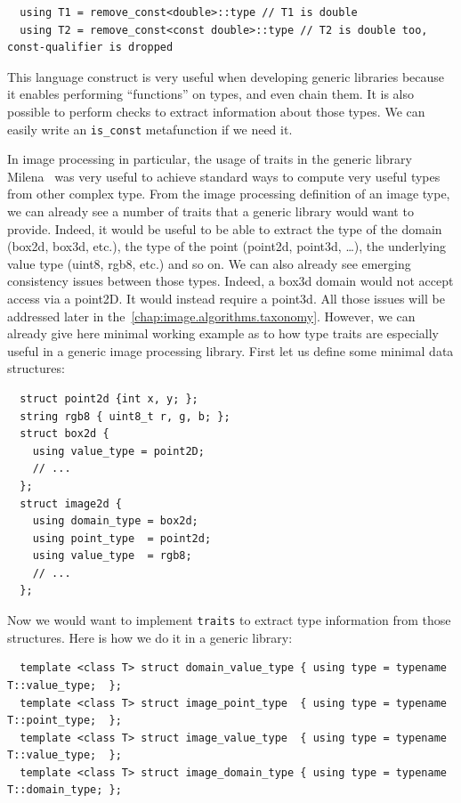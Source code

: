 \begin{verbatim}
  using T1 = remove_const<double>::type // T1 is double
  using T2 = remove_const<const double>::type // T2 is double too, const-qualifier is dropped
\end{verbatim}

This language construct is very useful when developing generic libraries because it enables performing ``functions'' on
types, and even chain them. It is also possible to perform checks to extract information about those types. We can
easily write an \texttt{is\_const} metafunction if we need it.

In image processing in particular, the usage of traits in the generic library
Milena~\parencite{levillain.2009.ismm,levillain.2010.icip} was very useful to achieve standard ways to compute very
useful types from other complex type. From the image processing definition of an image type, we can already see a number
of traits that a generic library would want to provide. Indeed, it would be useful to be able to extract the type of the
domain (box2d, box3d, etc.), the type of the point (point2d, point3d, \ldots), the underlying value type (uint8, rgb8,
etc.) and so on. We can also already see emerging consistency issues between those types. Indeed, a box3d domain would
not accept access via a point2D. It would instead require a point3d. All those issues will be addressed later in
the~\cref{chap:image.algorithms.taxonomy}. However, we can already give here minimal working example as to how type
traits are especially useful in a generic image processing library. First let us define some minimal data structures:

\begin{verbatim}
  struct point2d {int x, y; };
  string rgb8 { uint8_t r, g, b; };
  struct box2d {
    using value_type = point2D;
    // ...
  };
  struct image2d {
    using domain_type = box2d;
    using point_type  = point2d;
    using value_type  = rgb8;
    // ...
  };
\end{verbatim}

Now we would want to implement \texttt{traits} to extract type information from those structures. Here is how we do it
in a generic library:

\begin{verbatim}
  template <class T> struct domain_value_type { using type = typename T::value_type;  };
  template <class T> struct image_point_type  { using type = typename T::point_type;  };
  template <class T> struct image_value_type  { using type = typename T::value_type;  };
  template <class T> struct image_domain_type { using type = typename T::domain_type; };
\end{verbatim}

